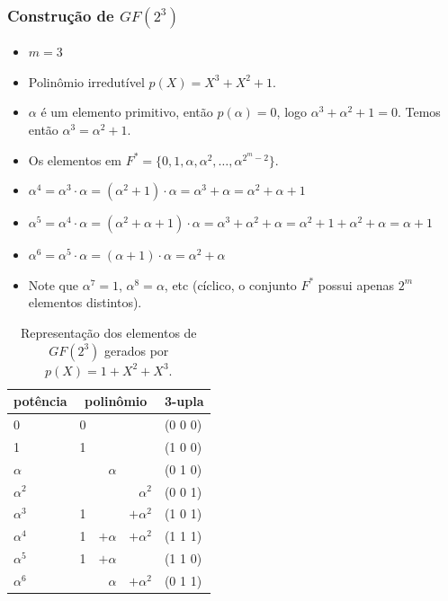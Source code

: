 \documentclass[portuguese,aspectratio=169]{beamer}
\begin{document}
\begin{frame}[allowframebreaks]
  \frametitle{Construção de $GF(2^3)$}
  \begin{itemize}
  \item $m=3$
  \item Polinômio irredutível $p(X)=X^3+X^2+1$.
  \item $\alpha$ é um elemento primitivo, então $p(\alpha) = 0$, logo $\alpha^3 + \alpha^2 + 1 = 0$. Temos então $\alpha^3 = \alpha^2 + 1$.
  \item Os elementos em $F^\ast = \{0, 1, \alpha, \alpha^2, \ldots, \alpha^{2^m-2}\}$.
  \item $\alpha^4 = \alpha^3 \cdot \alpha = (\alpha^2 + 1) \cdot \alpha = \alpha^3 + \alpha = \alpha^2 + \alpha + 1$
  \item $\alpha^5 = \alpha^4 \cdot \alpha = (\alpha^2 + \alpha + 1) \cdot \alpha = \alpha^3 + \alpha^2 + \alpha = \alpha^2 + 1 + \alpha^2 + \alpha = \alpha + 1$
  \item $\alpha^6 = \alpha^5 \cdot \alpha = (\alpha + 1) \cdot \alpha = \alpha^2 + \alpha$
  \item Note que $\alpha^7 = 1$, $\alpha^8 = \alpha$, etc (cíclico, o conjunto $F^\ast$ possui apenas $2^{m}$ elementos distintos).
  \end{itemize}

  \framebreak
  \begin{table}
    \caption{Representação dos elementos de $GF(2^3)$ gerados por $p(X)=1+X^2+X^3$.}
    \begin{tabular}{lrrrl}
      potência & \multicolumn{3}{c}{polinômio} & 3-upla \\
      \hline
      0          & 0 & & & (0 0 0)\\ 
      1          & 1 & & & (1 0 0) \\
      $\alpha$   & & $\alpha$ & & (0 1 0) \\
      $\alpha^2$ & & & $\alpha^2$ & (0 0 1) \\
      $\alpha^3$ & 1 & & $+\alpha^2$ & (1 0 1) \\
      $\alpha^4$ & 1 & $+\alpha$ & $+\alpha^2$ & (1 1 1) \\
      $\alpha^5$ & 1 & $+\alpha$ & & (1 1 0) \\
      $\alpha^6$ & & $\alpha$ & $+\alpha^2$ & (0 1 1)
    \end{tabular}
  \end{table}
\end{frame}
\end{document}
